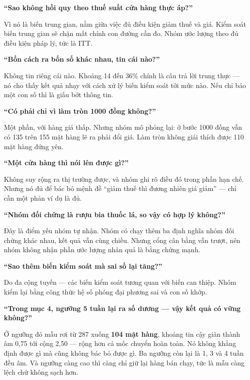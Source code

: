 \documentclass[12pt]{article}
\newenvironment{noi}%
  {\vspace{3pt}\begin{list}{}{%
     \setlength{\leftmargin}{14pt}\setlength{\rightmargin}{0pt}%
     \setlength{\itemindent}{0pt}\setlength{\listparindent}{0pt}%
     \setlength{\parsep}{5pt}}\item[]%
   \color{black}}%
  {\end{list}\vspace{2pt}}
\begin{document}
\textbf{``Sao không hồi quy theo thuế suất cửa hàng thực áp?''}
\begin{noi}
Vì nó là biến trung gian, nằm giữa việc đủ điều kiện giảm thuế và giá. Kiểm soát
biến trung gian sẽ chặn mất chính con đường cần đo. Nhóm ước lượng theo đủ điều
kiện pháp lý, tức là ITT.
\end{noi}

\textbf{``Bốn cách ra bốn số khác nhau, tin cái nào?''}
\begin{noi}
Không tin riêng cái nào. Khoảng 14 đến 36\% chính là câu trả lời trung thực --- nó
cho thấy kết quả nhạy với cách xử lý biến kiểm soát tới mức nào. Nếu chỉ báo một
con số thì là giấu bớt thông tin.
\end{noi}

\textbf{``Có phải chỉ vì làm tròn 1000 đồng không?''}
\begin{noi}
Một phần, với hàng giá thấp. Nhưng nhóm mô phỏng lại: ở bước 1000 đồng vẫn có 135
trên 155 mặt hàng lẽ ra phải đổi giá. Làm tròn không giải thích được 110 mặt hàng
đứng yên.
\end{noi}

\textbf{``Một cửa hàng thì nói lên được gì?''}
\begin{noi}
Không suy rộng ra thị trường được, và nhóm ghi rõ điều đó trong phần hạn chế. Nhưng
nó đủ để bác bỏ mệnh đề ``giảm thuế thì đương nhiên giá giảm'' --- chỉ cần một phản
ví dụ là đủ.
\end{noi}

\textbf{``Nhóm đối chứng là rượu bia thuốc lá, so vậy có hợp lý không?''}
\begin{noi}
Đây là điểm yếu nhóm tự nhận. Nhóm có chạy thêm ba định nghĩa nhóm đối chứng khác
nhau, kết quả vẫn cùng chiều. Nhưng cổng cân bằng vẫn trượt, nên nhóm không nhận
phần ước lượng nhân quả là bằng chứng mạnh.
\end{noi}

\textbf{``Sao thêm biến kiểm soát mà sai số lại tăng?''}
\begin{noi}
Do đa cộng tuyến --- các biến kiểm soát tương quan với biến can thiệp. Nhóm kiểm
lại bằng công thức hệ số phóng đại phương sai và con số khớp.
\end{noi}

\textbf{``Trong mục 4, ngưỡng 5 tuần lại ra số dương --- vậy kết quả có vững không?''}
\begin{noi}
Ở ngưỡng đó mẫu rơi từ 287 xuống \textbf{104 mặt hàng}, khoảng tin cậy giãn thành
âm 0,75 tới cộng 2,50 --- rộng hơn cả mốc chuyển hoàn toàn. Nó không khẳng định được
gì mà cũng không bác bỏ được gì. Ba ngưỡng còn lại là 1, 3 và 4 tuần đều âm. Và ngưỡng
càng cao thì càng chỉ giữ lại hàng bán chạy, tức là mẫu càng lệch chứ không sạch hơn.
\end{noi}
\end{document}
